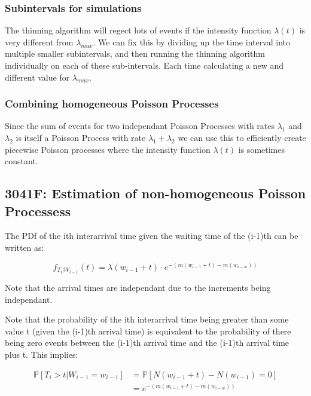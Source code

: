 \subsubsection{Subintervals for simulations}
The thinning algorithm will regect lots of events if the intensity function \(\lambda(t)\) 
is very different from \(\lambda_{max}\). We can fix this by dividing up the time interval
into multiple smaller subintervals, and then running the thinning algorithm individually on
each of these sub-intervals. Each time calculating a new and different value for 
\(\lambda_{max}\).
\subsubsection{Combining homogeneous Poisson Processes}
Since the sum of events for two independant Poisson Processes with rates 
\(\lambda_1\) and \(\lambda_2\) is itself a Poisson Process with rate \(\lambda_1 + \lambda_2\)
we can use this to efficiently create piecewise Poisson processes where the 
intensity function \(\lambda(t)\) is sometimes constant.
\subsection{3041F: Estimation of non-homogeneous Poisson Processess}
The PDf of the ith interarrival time given the waiting time of the (i-1)th can be written as:

\begin{equation*}
    f_{T_i | W_{i-1}}(t) = 
    \lambda(w_{i-1} + t) \cdot e^{-\left(m(w_{i-1} + t) - m(w_{i-w})\right)}
\end{equation*}

Note that the arrival times are independant due to the increments being independant. \newline \newline

Note that the probability of the ith interarrival time being greater than some value t (given 
the (i-1)th arrival time) is equivalent to the probability of there being zero events between 
the (i-1)th arrival time and the (i-1)th arrival time plus t. This implies:

\begin{equation*}
    \begin{aligned}
        \mathbb{P}[T_i > t | W_{i-1} = w_{i-1}] &= \mathbb{P}[N(w_{i-1} + t) - N(w_{i-1}) = 0] \\
                                                &=  e^{-\left(m(w_{i-1} + t) - m(w_{i-w})\right)} \\
    \end{aligned}
\end{equation*}
